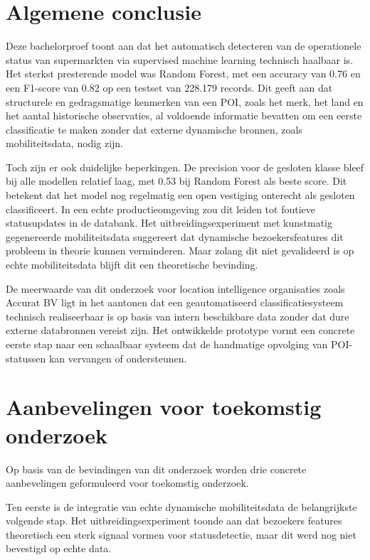 \section{Algemene conclusie}
Deze bachelorproef toont aan dat het automatisch detecteren van de operationele status van supermarkten via supervised machine learning technisch haalbaar is. Het sterkst presterende model was Random Forest, met een accuracy van 0.76 en een F1-score van 0.82 op een testset van 228.179 records. Dit geeft aan dat structurele en gedragsmatige kenmerken van een POI, zoals het merk, het land en het aantal historische observaties, al voldoende informatie bevatten om een eerste classificatie te maken zonder dat externe dynamische bronnen, zoals mobiliteitsdata, nodig zijn.

Toch zijn er ook duidelijke beperkingen. De precision voor de gesloten klasse bleef bij alle modellen relatief laag, met 0.53 bij Random Forest als beste score. Dit betekent dat het model nog regelmatig een open vestiging onterecht als gesloten classificeert. In een echte productieomgeving zou dit leiden tot foutieve statusupdates in de databank. Het uitbreidingsexperiment met kunstmatig gegenereerde mobiliteitsdata suggereert dat dynamische bezoekersfeatures dit probleem in theorie kunnen verminderen. Maar zolang dit niet gevalideerd is op echte mobiliteitsdata blijft dit een theoretische bevinding.

De meerwaarde van dit onderzoek voor location intelligence organisaties zoals Accurat BV ligt in het aantonen dat een geautomatiseerd classificatiesysteem technisch realiseerbaar is op basis van intern beschikbare data zonder dat dure externe databronnen vereist zijn. Het ontwikkelde prototype vormt een concrete eerste stap naar een schaalbaar systeem dat de handmatige opvolging van POI-statussen kan vervangen of ondersteunen.

\section{Aanbevelingen voor toekomstig onderzoek}

Op basis van de bevindingen van dit onderzoek worden drie concrete aanbevelingen geformuleerd voor toekomstig onderzoek.

Ten eerste is de integratie van echte dynamische mobiliteitsdata de belangrijkste volgende stap. Het uitbreidingsexperiment toonde aan dat bezoekers features theoretisch een sterk signaal vormen voor statusdetectie, maar dit werd nog niet bevestigd op echte data. 

